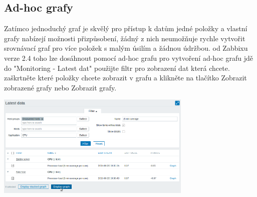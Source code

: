 \documentclass{article}
\begin{document}
    \subsection{Ad-hoc grafy}
    Zatímco jednoduchý graf je skvělý pro přístup k datům jedné položky a vlastní grafy nabízejí možnosti přizpůsobení, žádný z nich neumožňuje rychle vytvořit srovnávací graf pro více položek s malým úsilím a žádnou údržbou.\newline
    od Zabbixu verze 2.4 toho lze dosáhnout pomocí ad-hoc grafu
    pro vytvoření ad-hoc grafu jdě do "Monitoring - Latest dat" použijte filtr pro zobrazení dat která chcete.  zaškrtněte které položky chcete zobrazit v grafu a klikněte na tlačítko Zobrazit zobrazené grafy nebo Zobrazit grafy.
    \begin{center}
        \includegraphics[width=0.7\textwidth]{obrazky/ad_hoc_graphs.png}
   \end{center}
\end{document}
